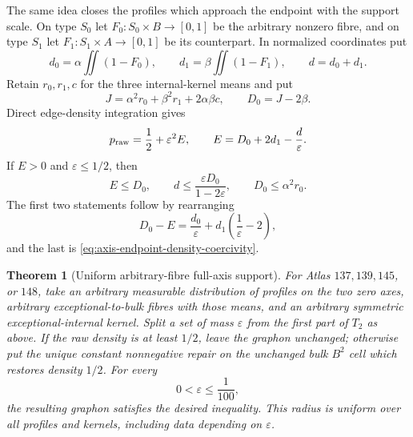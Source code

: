 \documentclass[11pt]{article}
\newtheorem{theorem}{Theorem}[section]
\begin{document}
The same idea closes the profiles which approach the endpoint with the
support scale.  On type $S_0$ let
$F_0:S_0\times B\to[0,1]$ be the arbitrary nonzero fibre, and on type $S_1$
let $F_1:S_1\times A\to[0,1]$ be its counterpart.  In normalized
coordinates put
\[
 d_0=\alpha\iint(1-F_0),\qquad
 d_1=\beta\iint(1-F_1),\qquad d=d_0+d_1.
\]
Retain $r_0,r_1,c$ for the three internal-kernel means and put
\[
 J=\alpha^2r_0+\beta^2r_1+2\alpha\beta c,
 \qquad D_0=J-2\beta.
\]
Direct edge-density integration gives
\begin{equation}
 p_{\rm raw}=\frac12+\varepsilon^2E,
 \qquad
 E=D_0+2d_1-\frac d\varepsilon.
 \label{eq:full-axis-density}
\end{equation}
If $E>0$ and $\varepsilon\leq1/2$, then
\begin{equation}
 E\leq D_0,
 \qquad
 d\leq\frac{\varepsilon D_0}{1-2\varepsilon},
 \qquad
 D_0\leq\alpha^2r_0.
 \label{eq:full-axis-coercivity}
\end{equation}
The first two statements follow by rearranging
\[
 D_0-E=\frac{d_0}{\varepsilon}
       +d_1\left(\frac1\varepsilon-2\right),
\]
and the last is \eqref{eq:axis-endpoint-density-coercivity}.

\begin{theorem}[Uniform arbitrary-fibre full-axis support]
\label{thm:full-axis-uniform}
For Atlas $137,139,145$, or $148$, take an arbitrary measurable distribution
of profiles on the two zero axes, arbitrary exceptional-to-bulk fibres with
those means, and an arbitrary symmetric exceptional-internal kernel.  Split
a set of mass $\varepsilon$ from the first part of $T_2$ as above.  If the
raw density is at least $1/2$, leave the graphon unchanged; otherwise put the
unique constant nonnegative repair on the unchanged bulk $B^2$ cell which
restores density $1/2$.  For every
\[
 0<\varepsilon\leq\frac1{100},
\]
the resulting graphon satisfies the desired inequality.  This radius is
uniform over all profiles and kernels, including data depending on
$\varepsilon$.
\end{theorem}
\end{document}
